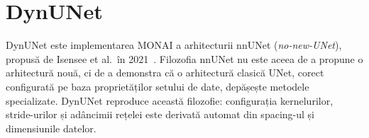 \documentclass[12pt, a4paper]{report}
\begin{document}

\section{DynUNet}
\label{sec:dynunet}

DynUNet este implementarea MONAI a arhitecturii nnUNet
(\textit{no-new-UNet}), propusă de Isensee et al.\ în
2021~\cite{isensee2019automated, isensee2018selfadapting}. Filozofia nnUNet nu este aceea de a
propune o arhitectură nouă, ci de a demonstra că o arhitectură
clasică UNet, corect configurată pe baza proprietăților setului de
date, depășește metodele specializate. DynUNet reproduce această
filozofie: configurația kernelurilor, stride-urilor și adâncimii
rețelei este derivată automat din spacing-ul și dimensiunile datelor.

\vspace{6pt}
\end{document}
